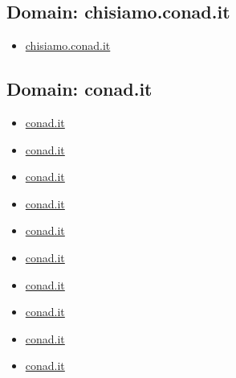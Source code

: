 \documentclass{article}
\begin{document}
    \subsection{Domain: chisiamo.conad.it}
    \begin{itemize}
        
            
            \item \href{ https://chisiamo.conad.it/}{ chisiamo.conad.it }
            
        
    \end{itemize}

    \subsection{Domain: conad.it}
    \begin{itemize}
        
            
            \item \href{ http://smart.conad.it}{ conad.it }
            
            \item \href{ https://mypass.conad.it/mypass/}{ conad.it }
            
            \item \href{ https://tupperware.conad.it/}{ conad.it }
            
            \item \href{ http://gepamweb.conad.it}{ conad.it }
            
            \item \href{ https://www.conad.it/servizio-clienti-e-faq?utm\_source=massiva\&utm\_medium=email\&utm\_content=124717596\&utm\_campaign=\_2021\_NON\_CANCELLARE\_Test\_Proof\_Agenzia\&p1=\%2Fnegozio.007471}{ conad.it }
            
            \item \href{ http://wip.conad.it/}{ conad.it }
            
            \item \href{ http://mipremio-pin.conad.it/}{ conad.it }
            
            \item \href{ https://chisiamo.conad.it/}{ conad.it }
            
            \item \href{ http://leclercdrive.conad.it/}{ conad.it }
            
            \item \href{ https://www.conad.it/}{ conad.it }
            

\end{itemize}
\end{document}
